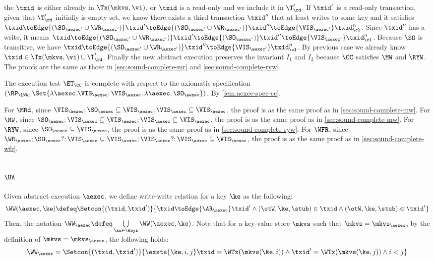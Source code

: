 the \( \txid \) is either already in \( \Tx(\mkvs, \vi) \), 
or \( \txid \) is a read-only and we include it in \( \T'_\rd \).
If \( \txid' \) is a read-only transaction,
given that \( \T'_\rd \) initially is empty set,
we know there exists a third transaction \( \txid'' \) that at least writes to some key
and it satisfies \( \txid \toEdge{( \SO_{\aexec'} \cup \WR_{\aexec'} )}  \txid' \toEdge{( \SO_{\aexec'} \cup \WR_{\aexec'} )}  \txid'' \toEdge{\VIS_{\aexec'}} \txid_\cl^n \).
Since \( \txid'' \) has a write, it means 
\( \txid \toEdge{( \SO_{\aexec'} \cup \WR_{\aexec'} )}  \txid' \toEdge{( \SO_{\aexec'} )}  \txid'' \toEdge{\VIS_{\aexec'}} \txid_\cl^n \).
Because \( \SO \) is transitive, we have \( \txid \toEdge{( \SO_{\aexec'} \cup \WR_{\aexec'} )} \txid'' \toEdge{\VIS_{\aexec'}} \txid_\cl^n \).
By previous case we already know \( \txid \in \Tx(\mkvs, \vi) \cup \T'_\rd \).
Finally the new abstract execution preserves the invariant \( I_1 \) and \( I_2 \) 
because  \( \CC \) satisfies \( \MW \) and \( \RYW \).
The proofs are the same as those in \cref{sec:sound-complete-mr} and \cref{sec:sound-complete-ryw}.

The execution test $\ET_\CC$ is complete with respect to the axiomatic specification 
\( (\RP_{\LWW}, \Set{\lambda \aexec. \VIS_{\aexec} ; \VIS_{\aexec}, \lambda \aexec \ldotp \SO_\aexec })\).
By \cref{lem:aexec-spec-cc}, 

For \( \MRd \), since \(  \VIS_\aexec ; \SO_\aexec \subseteq  \VIS_\aexec ; \VIS_{\aexec} \subseteq \VIS_\aexec \),
the proof is as the same proof as in \cref{sec:sound-complete-mw}.
For \( \MW \), since \( \SO_\aexec ; \VIS_\aexec \subseteq  \VIS_\aexec ; \VIS_{\aexec} \subseteq \VIS_\aexec \),
the proof is as the same proof as in \cref{sec:sound-complete-mw}.
For \( \RYW \), since \( \SO_\aexec \subseteq \VIS_\aexec \),
the proof is as the same proof as in \cref{sec:sound-complete-ryw}.
For \( \WFR \), since \( \WR_\aexec ; \SO_\aexec? ; \VIS_\aexec \subseteq \VIS_\aexec ; \VIS_{\aexec}? ; \VIS_\aexec \subseteq \VIS_\aexec \),
the proof is as the same proof as in \cref{sec:sound-complete-wfr}.


\subsection{\( \UA \)}
\label{sec:sound-complete-ua}

Given abstract execution \( \aexec \), we define write-write relation for a key \( \ke \) as the following:
\[ 
    \WW(\aexec,\ke) \defeq \Setcon{(\txid, \txid')}{\txid \toEdge{\AR_\aexec} \txid' \land (\otW,\ke, \stub ) \in \txid \land (\otW,\ke, \stub ) \in \txid'  } 
\]
Then, the notation \( \WW_\aexec \defeq \bigcup\limits_{\ke \in \Keys} \WW(\aexec, \ke) \).
Note that for a key-value store \( \mkvs \) such that \( \mkvs = \mkvs_\aexec \),
by the definition of  \(  \mkvs = \mkvs_\aexec \), 
the following holds:
\[
    \WW_\aexec = \Setcon{(\txid, \txid')}{\exsts{\ke, i,j } \txid = \WTx(\mkvs(\ke, i)) \land \txid' = \WTx(\mkvs(\ke, j)) \land i < j}
\]


